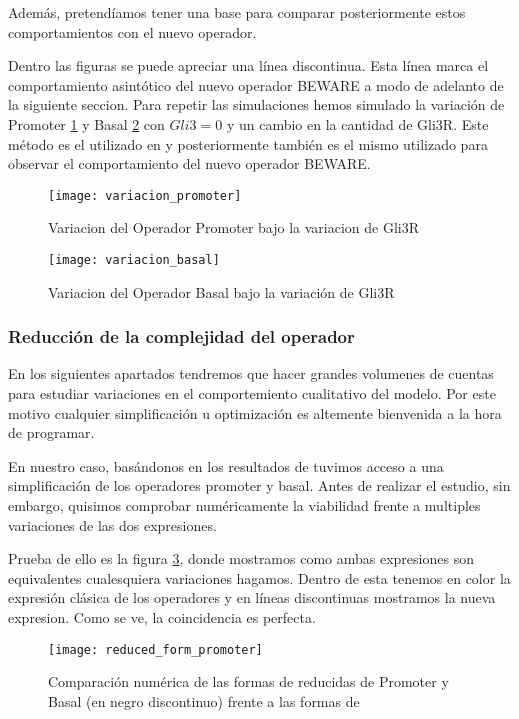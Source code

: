Además, pretendíamos tener una base para comparar posteriormente estos comportamientos con el nuevo operador.

Dentro las figuras se puede apreciar una línea discontinua. Esta línea marca el comportamiento asintótico del nuevo operador BEWARE a modo de adelanto de la siguiente seccion. 
Para repetir las simulaciones hemos simulado la variación de Promoter \ref{varipro} y Basal \ref{varibas} con $Gli3=0$ y un cambio en la cantidad de Gli3R. Este método es el utilizado en \cite{schaffer} y posteriormente también es el mismo utilizado para observar el comportamiento del nuevo operador BEWARE.

 \begin{figure}[h]
 	\texttt{[image: variacion\_promoter]}
 	\centering
 	\caption{Variacion del Operador Promoter bajo la variacion de Gli3R }
 	\label{varipro}
 \end{figure}

\begin{figure}[h]
	\texttt{[image: variacion\_basal]}
	\centering
	\caption{Variacion del Operador Basal bajo la variación de Gli3R }
	\label{varibas}
\end{figure}

\subsubsection{Reducción de la complejidad del operador}

En los siguientes apartados tendremos que hacer grandes volumenes de cuentas para estudiar variaciones en el comportemiento cualitativo del modelo. Por este motivo cualquier simplificación u optimización es altemente bienvenida a la hora de programar. 

En nuestro caso, basándonos en los resultados de \cite{multiple} tuvimos acceso a una simplificación de los operadores promoter y basal. Antes de realizar el estudio, sin embargo, quisimos comprobar numéricamente la viabilidad frente a multiples variaciones de las dos expresiones. 

Prueba de ello es la figura \ref{compara}, donde mostramos como ambas expresiones son equivalentes cualesquiera variaciones hagamos. Dentro de esta tenemos en color la expresión clásica de los operadores y en líneas discontinuas mostramos la nueva expresion. Como se ve, la coincidencia es perfecta. 

\begin{figure}[h]
	\texttt{[image: reduced\_form\_promoter]}
	\centering
	\caption{Comparación numérica de las formas de reducidas de Promoter y Basal (en negro discontinuo) frente a las formas de \cite{schaffer} }
	\label{compara}
\end{figure}

